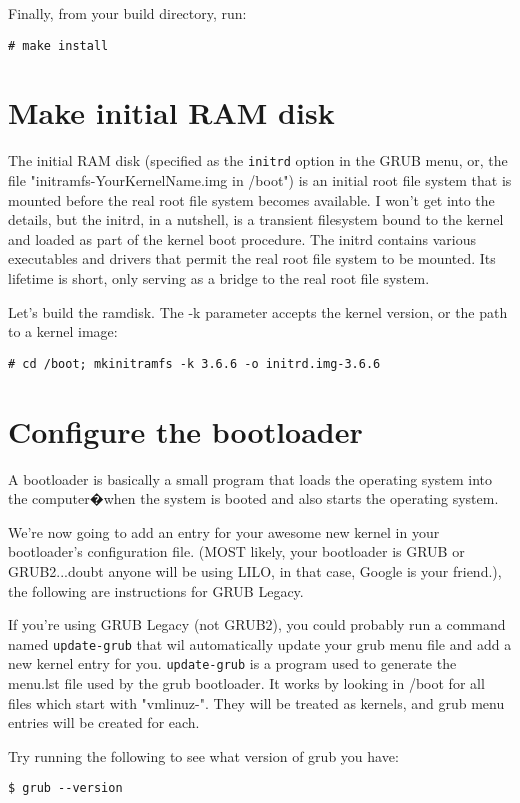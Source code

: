 \documentclass{article}
\begin{document}
Finally, from your build directory, run: 
\begin{verbatim}# make install\end{verbatim} 


\section{Make initial RAM disk}
The initial RAM disk (specified as the \texttt{initrd} option in the GRUB menu, or, the file "initramfs-YourKernelName.img in /boot") is an initial root file system that is mounted before the real root file system becomes available. I won't get into the details, but the initrd, in a nutshell, is a transient filesystem bound to the kernel and loaded as part of the kernel boot procedure. The initrd contains various executables and drivers that permit the real root file system to be mounted. Its lifetime is short, only serving as a bridge to the real root file system. 

Let's build the ramdisk. The -k parameter accepts the kernel version, or the path to a kernel image: 
\begin{verbatim}# cd /boot; mkinitramfs -k 3.6.6 -o initrd.img-3.6.6 \end{verbatim}


\section{Configure the bootloader}
A bootloader is basically a small program that loads the operating system into the computer�when the system is booted and also starts the operating system.

We're now going to add an entry for your awesome new kernel in your bootloader's configuration file. (MOST likely, your bootloader is GRUB or GRUB2...doubt anyone will be using LILO, in that case, Google is your friend.), the following are instructions for GRUB Legacy.

If you're using GRUB Legacy (not GRUB2), you could probably run a command named \texttt{update-grub} that wil automatically update your grub menu file and add a new kernel entry for you. \texttt{update-grub} is a program used to generate the menu.lst file used by the grub bootloader. It works by looking in /boot for all files which start with "vmlinuz-". They will be treated as kernels, and grub menu entries will be created for each. 

Try running the following to see what version of grub you have:
\begin{verbatim}$ grub --version \end{verbatim}
\end{document}
